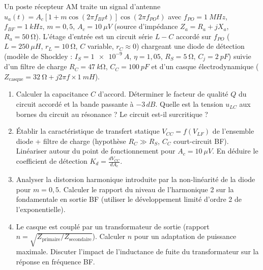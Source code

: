 \documentclass[11pt]{article}
\begin{document}
\begin{exercice}
Un poste récepteur AM traite un signal d'antenne $u_a(t) = A_c [1 + m \cos(2\pi f_{BF} t)] \cos(2\pi f_{PO} t)$ avec $f_{PO} = \SI{1}{MHz}$, $f_{BF} = \SI{1}{kHz}$, $m=0,5$, $A_c = \SI{10}{\mu V}$ (source d'impédance $Z_a = R_a + jX_a$, $R_a = \SI{50}{\ohm}$). L'étage d'entrée est un circuit série $L-C$ accordé sur $f_{PO}$ ($L = \SI{250}{\mu H}$, $r_L = \SI{10}{\ohm}$, $C$ variable, $r_C \approx 0$) chargeant une diode de détection (modèle de Shockley : $I_S = \SI{1e-9}{A}$, $\eta = 1,05$, $R_S = \SI{5}{\ohm}$, $C_j = \SI{2}{pF}$) suivie d'un filtre de charge $R_C = \SI{47}{k\ohm}$, $C_C = \SI{100}{pF}$ et d'un casque électrodynamique ($Z_{\text{casque}} = \SI{32}{\ohm} + j 2\pi f \times \SI{1}{mH}$).
\begin{enumerate}
    \item Calculer la capacitance $C$ d'accord. Déterminer le facteur de qualité $Q$ du circuit accordé et la bande passante à $-3\,\si{dB}$. Quelle est la tension $u_{LC}$ aux bornes du circuit au résonance ? Le circuit est-il surcritique ?
    \item Établir la caractéristique de transfert statique $V_{CC} = f(V_{LF})$ de l'ensemble diode + filtre de charge (hypothèse $R_C \gg R_S$, $C_C$ court-circuit BF). Linéariser autour du point de fonctionnement pour $A_c = \SI{10}{\mu V}$. En déduire le coefficient de détection $K_d = \frac{d V_{CC}}{d A_c}$.
    \item Analyser la distorsion harmonique introduite par la non-linéarité de la diode pour $m=0,5$. Calculer le rapport du niveau de l'harmonique 2 sur la fondamentale en sortie BF (utiliser le développement limité d'ordre 2 de l'exponentielle).
    \item Le casque est couplé par un transformateur de sortie (rapport $n = \sqrt{Z_{\text{primaire}}/Z_{\text{secondaire}}}$). Calculer $n$ pour un adaptation de puissance maximale. Discuter l'impact de l'inductance de fuite du transformateur sur la réponse en fréquence BF.
\end{enumerate}
\end{exercice}
\end{document}

